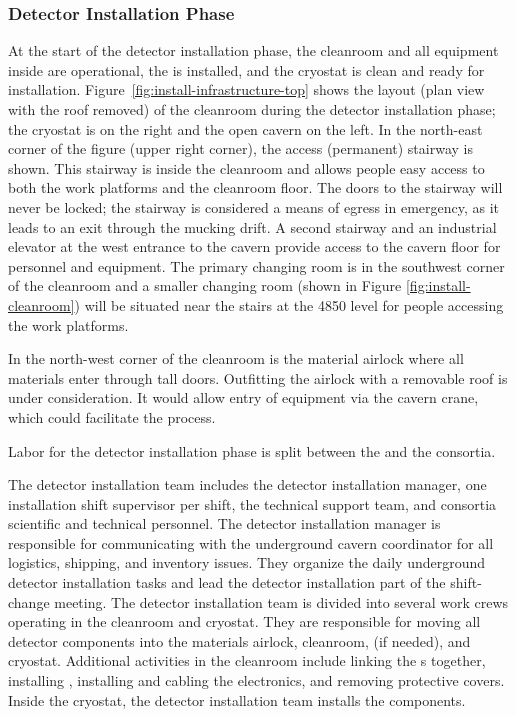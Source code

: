 \subsubsection{Detector Installation Phase}
\label{sec:fdsp-tc-inst-execute}



At the start of the detector installation phase, the cleanroom and all equipment inside are operational, the  is installed, and the cryostat is clean and ready for installation. 
Figure~\ref{fig:install-infrastructure-top} shows the layout (plan view with the roof removed) of the cleanroom during the detector installation phase; the cryostat is on the right and the open cavern on the left. 
In the north-east corner of the figure (upper right corner), the access  (permanent) stairway is shown. 
This stairway is inside the cleanroom and allows people easy access to both the work platforms and the cleanroom floor. 
The doors to the stairway will never be locked; the stairway is considered a means of egress in emergency, as it leads to an exit through the mucking drift.
A second stairway and an industrial elevator at the west entrance to the cavern provide access to the cavern floor for personnel and equipment. 
The primary changing room is in the southwest corner of the cleanroom and a smaller changing room (shown in Figure \ref{fig:install-cleanroom}) will be situated near the stairs at the 4850 level for people accessing the work platforms.

In the north-west corner of the cleanroom is the material airlock where all materials enter  through tall doors. 
Outfitting the airlock with a removable roof is under consideration. 
It would allow entry of equipment via the cavern crane, which could facilitate the process.
 
Labor for the detector installation phase is split between the  and the  consortia. 

The  detector installation team includes the  detector installation manager, one installation shift supervisor per shift, the  technical support team, and  consortia scientific and technical personnel.  The detector installation manager is responsible for communicating with the underground cavern
coordinator for all logistics, shipping, and inventory issues. They organize the daily underground detector installation tasks and lead the detector installation part of the shift-change meeting. The detector installation team is divided into several work crews operating in the cleanroom and cryostat. They are responsible for moving all detector components into the materials airlock, cleanroom, \coldbox  (if needed), and cryostat. Additional activities in the cleanroom include linking the s together, installing , installing and cabling the electronics, and removing   protective covers. Inside the cryostat, the detector installation team installs the   components. 

